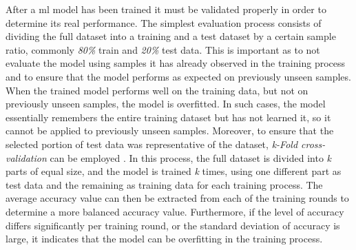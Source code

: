 After a \acrfull{ml} model has been trained it must be validated properly in order to determine its real performance. The simplest evaluation process consists of dividing the full dataset into a training and a test dataset by a certain sample ratio, commonly \textit{80\%} train and \textit{20\%} test data. This is important as to not evaluate the model using samples it has already observed in the training process and to ensure that the model performs as expected on previously unseen samples. When the trained model performs well on the training data, but not on previously unseen samples, the model is overfitted. In such cases, the model essentially remembers the entire training dataset but has not learned it, so it cannot be applied to previously unseen samples. Moreover, to ensure that the selected portion of test data was representative of the dataset, \textit{k-Fold cross-validation} can be employed \parencite{ghojogh2019theory}. In this process, the full dataset is divided into \textit{k} parts of equal size, and the model is trained \textit{k} times, using one different part as test data and the remaining as training data for each training process. The average accuracy value can then be extracted from each of the training rounds to determine a more balanced accuracy value. Furthermore, if the level of accuracy differs significantly per training round, or the standard deviation of accuracy is large, it indicates that the model can be overfitting in the training process.
